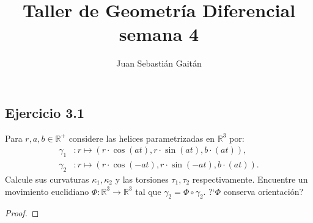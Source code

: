 \documentclass[12pt]{article}
\title{Taller de Geometr\'ia Diferencial semana 4 }
\author{Juan Sebasti\'an Gait\'an}
\begin{document}
\maketitle

\vspace{0.5in}



\subsection*{Ejercicio 3.1}
Para $r,a,b\in \mathbb{R}^{+}$  considere las helices parametrizadas en $\mathbb{R}^{3}$ por:
\begin{equation*}
\begin{split}
\gamma_{1}&: r \mapsto (r \cdot \cos (at), r \cdot \sin (at), b \cdot (at)), \\
\gamma_{2}&: r \mapsto (r \cdot \cos (-at), r \cdot \sin (-at) , b \cdot (at)).
\end{split}
\end{equation*}
Calcule sus curvaturas $\kappa_1 , \kappa_2 $ y las torsiones $\tau_1 , \tau_2$ respectivamente. Encuentre un movimiento euclidiano $\Phi: \mathbb{R}^3 \rightarrow \mathbb{R}^3$ tal que $\gamma_2=\Phi \circ \gamma_2$. ?`$\Phi$ conserva orientaci\'on?
\begin{proof}
\end{proof}

\end{document}
